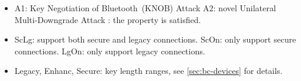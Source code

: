 \begin{table}[t]
\begin{threeparttable}[b]
\begin{tabularx}{\textwidth}{c>{\centering\arraybackslash}X>{\centering\arraybackslash}X>{\centering\arraybackslash}X>{\centering\arraybackslash}X>{\centering\arraybackslash}X>{\centering\arraybackslash}X}
    \hline
    \end{tabularx}
    \begin{tablenotes}
        \item[] 
        \begin{itemize}[leftmargin=*]
            \item   \hspace{0.25em} A1: Key Negotiation of Bluetooth~(KNOB) Attack\cite{antonioli2019knob} 
                    \hspace{1em} A2: novel Unilateral Multi-Downgrade Attack 
                    \hspace{1em} \textcolor{xhs_green}{}: the property is satisfied. 
            \item   \hspace{0.25em} ScLg: support both secure and legacy connections.
                    \hspace{1em} ScOn: only support secure connections.
                    \hspace{1em} LgOn: only support legacy connections.
            \item   \hspace{0.25em} Legacy, Enhanc, Secure: key length ranges, see \autoref{sec:bc-devices} for details.
        \end{itemize}
    \end{tablenotes}
    \end{threeparttable}
\end{table}

